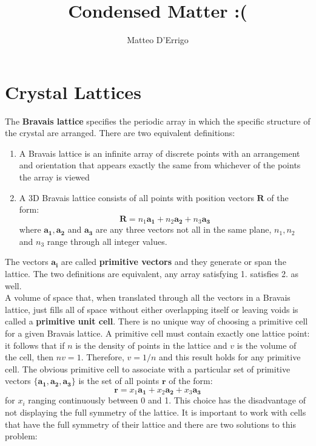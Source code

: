 \documentclass[10.75pt,a4paper,openright,bottom=2cm]{article}
\title{Condensed Matter :(}
\author{Matteo D'Errigo}
\renewcommand{\Vec}[1]{\boldsymbol{#1}}
\begin{document}
\maketitle
\tableofcontents
\newpage
\section{Crystal Lattices}
The \textbf{Bravais lattice} specifies the periodic array in which the specific structure of the crystal are arranged. There are two equivalent definitions:
\begin{enumerate}
    \item A Bravais lattice is an infinite array of discrete points with an arrangement and orientation that appears exactly the same from whichever of the points the array is viewed
    \item A 3D Bravais lattice consists of all points with position vectors $\Vec{R}$ of the form:
    \begin{equation}
    \label{R}
    \Vec{R}=n_1\Vec{a_1}+n_2\Vec{a_2}+n_3\Vec{a_3}
    \end{equation}
    where $\Vec{a_1}, \Vec{a_2}$ and $\Vec{a_3}$ are any three vectors not all in the same plane, $n_1, n_2$ and $n_3$ range through all integer values.
\end{enumerate}
The vectors $\Vec{a_i}$ are called \textbf{primitive vectors} and they generate or span the lattice. The two definitions are equivalent, any array satisfying 1. satisfies 2. as well.\\
A volume of space that, when translated through all the vectors in a Bravais lattice, just fills all of space without either overlapping itself or leaving voids is called a \textbf{primitive unit cell}. There is no unique way of choosing a primitive cell for a given Bravais lattice. A primitive cell must contain exactly one lattice point: it follows that if $n$ is the density of points in the lattice and $v$ is the volume of the cell, then $nv=1$. Therefore, $v=1/n$ and this result holds for any primitive cell. The obvious primitive cell to associate with a particular set of primitive vectors $\{\Vec{a_1},\Vec{a_2},\Vec{a_3}\}$ is the set of all points $\Vec{r}$ of the form:
\[
\Vec{r}=x_1\Vec{a_1}+x_2\Vec{a_2}+x_3\Vec{a_3}
\]
for $x_i$ ranging continuously between 0 and 1. This choice has the disadvantage of not displaying the full symmetry of the lattice. It is important to work with cells that have the full symmetry of their lattice and there are two solutions to this problem:
\end{document}

